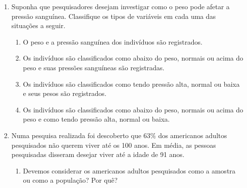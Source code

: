 {\begin{enumerate}
\begin{enumerate}
\item {} 
Um dado que lançado 180 vezes não tenha gerado a face 6 é um dado viciado (não equilibrado).

\item {} 
Se de 100 crianças vacinadas pela BCG contra a tuberculose apenas duas contraíram a doença, então a vacina tem eficácia de $98\%$.

\item {} 
Todo número par maior que 2 pode ser representado pela soma de dois números primos.

\item {} 
A precipitação de chuva amanhã será de aproximadamente 36 mm.

\item {} 
Se um feixe de paralelas está cortado por duas transversais então os segmentos determinados sobre uma transversal são respectivamente proporcionais aos segmentos determinados na outra.

\end{enumerate}

\item Suponha que pesquisadores desejam investigar como o peso pode afetar a pressão sanguínea. Classifique os tipos de variáveis em cada uma das situações a seguir.
\begin{enumerate}
\item {} 
O peso e a pressão sanguínea dos indivíduos são registrados.

\item {} 
Os indivíduos são classificados como abaixo do peso, normais ou acima do peso e suas pressões sanguíneas são registradas.

\item {} 
Os indivíduos são classificados como tendo pressão alta, normal ou baixa e seus pesos são registrados.

\item {} 
Os indivíduos são classificados como abaixo do peso, normais ou acima do peso e como tendo pressão alta, normal ou baixa.

\end{enumerate}

\item Numa pesquisa realizada foi descoberto que $63\%$ dos americanos adultos pesquisados não querem viver até os 100 anos. Em média, as pessoas pesquisadas disseram desejar viver até a idade de 91 anos.
\begin{enumerate}
\item {} 
Devemos considerar os americanos adultos pesquisados como a amostra ou como a população? Por quê?


\end{enumerate}
\end{enumerate}}
